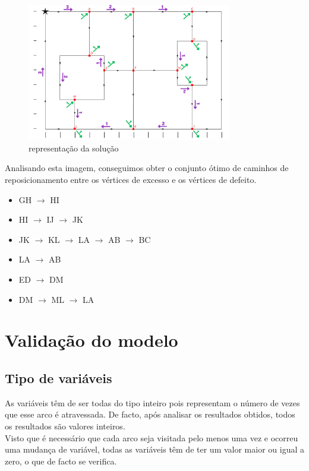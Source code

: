\documentclass[a4paper]{report}
\begin{document}
\begin{figure}[H]
    \begin{center}
        \includegraphics[width=0.8\textwidth]{images/desafioVisited.png}\par
        \caption{representação da solução}
        \label{fig:visited}
    \end{center}
\end{figure}
Analisando esta imagem, conseguimos obter o conjunto ótimo de caminhos de
reposicionamento entre os vértices de excesso e os vértices de defeito.

\begin{itemize}
        \item GH $\rightarrow$ HI
        \item HI $\rightarrow$ IJ $\rightarrow$ JK
        \item JK $\rightarrow$ KL $\rightarrow$ LA $\rightarrow$ AB $\rightarrow$ BC
        \item LA $\rightarrow$ AB
        \item ED $\rightarrow$ DM
        \item DM $\rightarrow$ ML $\rightarrow$ LA
\end{itemize}

\pagebreak
\section{Validação do modelo}
\subsection{Tipo de variáveis}
As variáveis têm de ser todas do tipo inteiro pois representam o número
de vezes que esse arco é atravessada. De facto, após analisar os resultados
obtidos, todos os resultados são valores inteiros.\\
Visto que é necessário que cada arco seja visitada pelo menos uma
vez e ocorreu uma mudança de variável, todas as variáveis têm de ter um valor
maior ou igual a zero, o que de facto se verifica.
\end{document}
